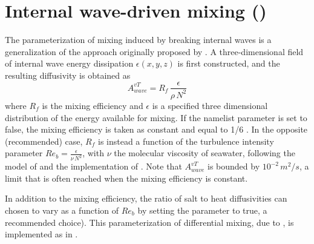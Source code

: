 \documentclass[../tex_main/NEMO_manual]{subfiles}
\begin{document}
\section{Internal wave-driven mixing (\protect{})}
\label{sec:ZDF_tmx_new}

%

The parameterization of mixing induced by breaking internal waves is a generalization 
of the approach originally proposed by \citet{St_Laurent_al_GRL02}. 
A three-dimensional field of internal wave energy dissipation $\epsilon(x,y,z)$ is first constructed, 
and the resulting diffusivity is obtained as 
\begin{equation} \label{eq:Kwave}
A^{vT}_{wave} =  R_f \,\frac{ \epsilon }{ \rho \, N^2 }
\end{equation}
where $R_f$ is the mixing efficiency and $\epsilon$ is a specified three dimensional distribution 
of the energy available for mixing. If the  namelist parameter is set to false, 
the mixing efficiency is taken as constant and equal to 1/6 \citep{Osborn_JPO80}. 
In the opposite (recommended) case, $R_f$ is instead a function of the turbulence intensity parameter 
$Re_b = \frac{ \epsilon}{\nu \, N^2}$, with $\nu$ the molecular viscosity of seawater, 
following the model of \cite{Bouffard_Boegman_DAO2013} 
and the implementation of \cite{de_lavergne_JPO2016_efficiency}.
Note that $A^{vT}_{wave}$ is bounded by $10^{-2}\,m^2/s$, a limit that is often reached when the mixing efficiency is constant.

In addition to the mixing efficiency, the ratio of salt to heat diffusivities can chosen to vary 
as a function of $Re_b$ by setting the  parameter to true, a recommended choice). 
This parameterization of differential mixing, due to \cite{Jackson_Rehmann_JPO2014}, 
is implemented as in \cite{de_lavergne_JPO2016_efficiency}.
\end{document}
